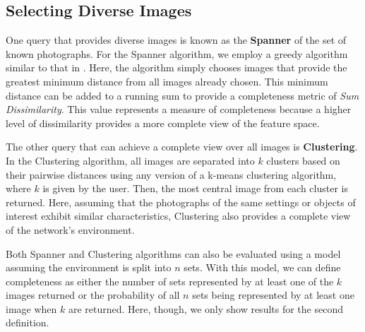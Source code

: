 \subsection{Selecting Diverse Images}
One query that provides diverse images is known as the {\bf Spanner} of the set of known photographs.  For the Spanner algorithm, we employ a greedy algorithm similar to that in \cite{mediascope}.  Here, the algorithm simply chooses images that provide the greatest minimum distance from all images already chosen.  This minimum distance can be added to a running sum to provide a completeness metric of \emph{Sum Dissimilarity}.  This value represents a measure of completeness because a higher level of dissimilarity provides a more complete view of the feature space.


The other query that can achieve a complete view over all images is {\bf Clustering}.  In the Clustering algorithm, all images are separated into $k$ clusters based on their pairwise distances using any version of a k-means clustering algorithm, where $k$ is given by the user.  Then, the most central image from each cluster is returned.  
Here, assuming that the photographs of the same settings or objects of interest exhibit similar characteristics, 
Clustering also provides a complete view of the network's environment.

Both Spanner and Clustering algorithms can also be evaluated using a model assuming the environment is split into $n$ sets.  With this model, we can define completeness as either the number of sets represented by at least one of the $k$ images returned or the probability of all $n$ sets being represented by at least one image when $k$ are returned.  Here, though, we only show results for the second definition.


